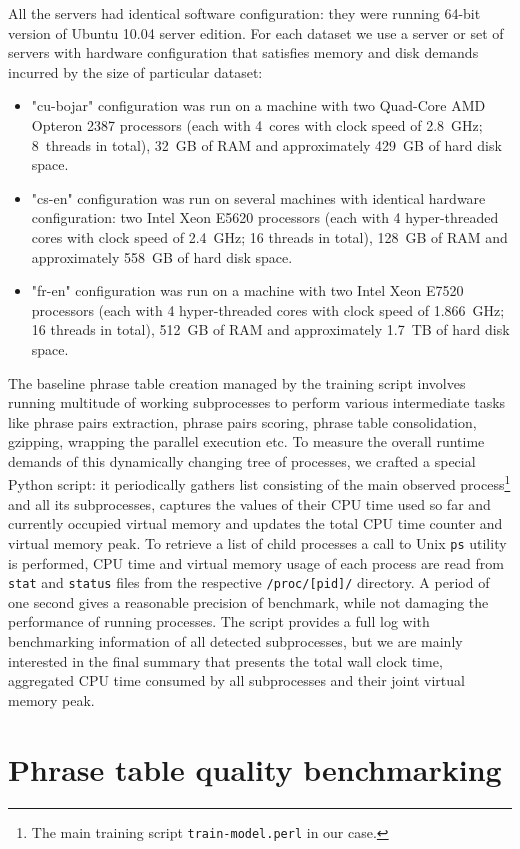 All the servers had identical software configuration:
they were running 64-bit version of Ubuntu 10.04 server edition.
For each dataset we use a server or set of servers with hardware configuration
that satisfies memory and disk demands incurred by the size of particular dataset:
\begin{itemize}
  \item "cu-bojar" configuration was run on a machine with two Quad-Core
  AMD Opteron\texttrademark{} 2387 processors (each with 4~cores with clock speed
  of 2.8~GHz; 8~threads in total),
  32~GB of RAM and approximately 429~GB of hard disk space. %
  \item "cs-en" configuration was run on several machines with identical hardware
  configuration: two Intel\textregistered{} Xeon\textregistered{} E5620
  processors
  (each with 4 hyper-threaded cores with clock speed of 2.4~GHz; 16 threads in total),
  128~GB of RAM and approximately 558~GB of hard disk space. %
  \item "fr-en" configuration was run on a machine with two Intel\textregistered{}
  Xeon\textregistered{} E7520
  processors
  (each with 4 hyper-threaded cores with clock speed of 1.866~GHz; 16 threads in total),
  512~GB of RAM and approximately 1.7~TB of hard disk space. %
\end{itemize}



The baseline phrase table creation managed by the training script involves
running multitude of working subprocesses to perform various intermediate
tasks like phrase pairs extraction, phrase pairs scoring, phrase table
consolidation, gzipping, wrapping the parallel execution etc.
To measure the overall runtime demands of this dynamically changing tree
of processes, we crafted a special Python script:
it periodically gathers list consisting of the main observed process\footnote{The main training script \texttt{train-model.perl} in our case.}
and all its subprocesses, captures the values of their CPU time used so far
and currently occupied virtual memory and updates the total CPU time counter
and virtual memory peak.
To retrieve a list of child processes a call to Unix \verb|ps| utility is
performed, CPU time and virtual memory usage of each process are read from
\verb|stat| and \verb|status| files from the respective \verb|/proc/[pid]/|
directory.
A period of one second gives a reasonable precision of benchmark, while
not damaging the performance of running processes.
The script provides a full log with benchmarking information of all detected
subprocesses, but we are mainly interested in the final summary that presents
the total wall clock time, aggregated CPU time consumed by all subprocesses
and their joint virtual memory peak.

\section{Phrase table quality benchmarking}

